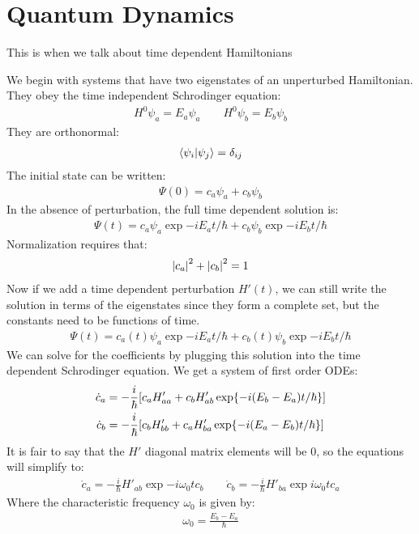 \section{Quantum Dynamics}
This is when we talk about time dependent Hamiltonians

We begin with systems that have two eigenstates of an unperturbed Hamiltonian. They obey the time independent Schrodinger equation:
\begin{align*}
  H^0\psi_a=E_a\psi_a\qquad H^0\psi_b=E_b\psi_b
\end{align*}
They are orthonormal:
\begin{align*}
  \ip{\psi_i}{\psi_j}=\delta_{ij}
\end{align*}
The initial state can be written:
\begin{align*}
  \Psi(0)=c_a\psi_a+c_b\psi_b
\end{align*}
In the absence of perturbation, the full time dependent solution is:
\begin{align*}
  \Psi(t)=c_a\psi_a\exp{-iE_at/\hbar}+c_b\psi_b\exp{-iE_bt/\hbar}
\end{align*}
Normalization requires that:
\begin{align*}
  \abs{c_a}^2+\abs{c_b}^2=1
\end{align*}
Now if we add a time dependent perturbation $H'(t)$, we can still write the solution in terms of the eigenstates since they form a complete set, but the constants need to be functions of time.
\begin{align*}
  \Psi(t)=c_a(t)\psi_a\exp{-iE_at/\hbar}+c_b(t)\psi_b\exp{-iE_bt/\hbar}
\end{align*}
We can solve for the coefficients by plugging this solution into the time dependent Schrodinger equation. We get a system of first order ODEs:
\begin{align*}
  \dot{c}_a&=-\frac{i}{\hbar}\qty[c_aH'_{aa}+c_bH'_{ab}\exp{-i(E_b-E_a)t/\hbar}]\\
  \dot{c}_b&=-\frac{i}{\hbar}\qty[c_bH'_{bb}+c_aH'_{ba}\exp{-i(E_a-E_b)t/\hbar}]\\
\end{align*}
It is fair to say that the $H'$ diagonal matrix elements will be $0$, so the equations will simplify to:
\begin{align*}
  \dot{c}_a=-\frac{i}{\hbar}H'_{ab}\exp{-i\omega_0t}c_b\qquad
  \dot{c}_b=-\frac{i}{\hbar}H'_{ba}\exp{i\omega_0t}c_a
\end{align*}
Where the characteristic frequency $\omega_0$ is given by:
\begin{align*}
  \omega_0=\frac{E_b-E_a}{\hbar}
\end{align*}
